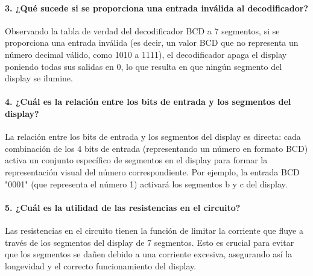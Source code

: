         \paragraph{3. ¿Qué sucede si se proporciona una entrada inválida al decodificador?}
        Observando la tabla de verdad del decodificador BCD a 7 segmentos, si se proporciona una entrada inválida (es decir, un valor BCD que no representa un número decimal válido, como 1010 a 1111), el decodificador apaga el display poniendo todas sus salidas en 0, lo que resulta en que ningún segmento del display se ilumine.

        \paragraph{4. ¿Cuál es la relación entre los bits de entrada y los segmentos del display?}
        La relación entre los bits de entrada y los segmentos del display es directa: cada combinación de los 4 bits de entrada (representando un número en formato BCD) activa un conjunto específico de segmentos en el display para formar la representación visual del número correspondiente. Por ejemplo, la entrada BCD "0001" (que representa el número 1) activará los segmentos b y c del display.

        \paragraph{5. ¿Cuál es la utilidad de las resistencias en el circuito?}
        Las resistencias en el circuito tienen la función de limitar la corriente que fluye a través de los segmentos del display de 7 segmentos. Esto es crucial para evitar que los segmentos se dañen debido a una corriente excesiva, asegurando así la longevidad y el correcto funcionamiento del display.